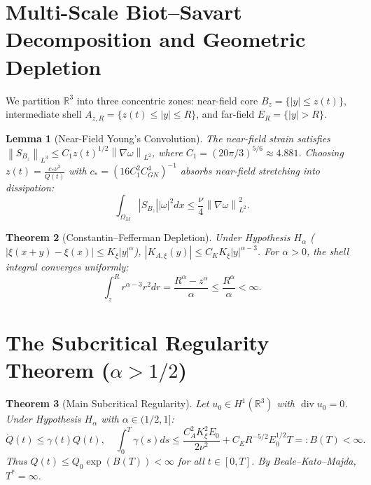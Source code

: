 \documentclass[11pt,reqno]{amsart}
\numberwithin{equation}{section}
\newtheorem{theorem}{Theorem}[section]
\newtheorem{lemma}[theorem]{Lemma}
\theoremstyle{definition}
\newcommand{\R}{\mathbb{R}}
\newcommand{\norm}[1]{\left\lVert#1\right\rVert}
\begin{document}
\section{Multi-Scale Biot--Savart Decomposition and Geometric Depletion}

We partition $\R^3$ into three concentric zones: near-field core $B_z = \{|y| \le z(t)\}$, intermediate shell $A_{z,R} = \{z(t) \le |y| \le R\}$, and far-field $E_R = \{|y| > R\}$.

\begin{lemma}[Near-Field Young's Convolution]\label{lem:near_field}
The near-field strain satisfies $\norm{S_{B_z}}_{L^3} \le C_1 z(t)^{1/2} \norm{\nabla \omega}_{L^2}$, where $C_1 = (20\pi/3)^{5/6} \approx 4.881$. Choosing $z(t) = \frac{c_* \nu^2}{Q(t)}$ with $c_* = (16 C_1^2 C_{GN}^4)^{-1}$ absorbs near-field stretching into dissipation:
\begin{equation}\label{eq:near_absorb}
\int_{\Omega_M} |S_{B_z}| |\omega|^2 dx \le \frac{\nu}{4} \norm{\nabla \omega}_{L^2}^2.
\end{equation}
\end{lemma}

\begin{theorem}[Constantin--Fefferman Depletion]\label{thm:CF}
Under Hypothesis $H_\alpha$ ($|\xi(x+y) - \xi(x)| \le K_\xi |y|^\alpha$), $|K_{A,\xi}(y)| \le C_K K_\xi |y|^{\alpha - 3}$.
For $\alpha > 0$, the shell integral converges uniformly:
\begin{equation}\label{eq:shell_converge}
\int_z^R r^{\alpha - 3} r^2 dr = \frac{R^\alpha - z^\alpha}{\alpha} \le \frac{R^\alpha}{\alpha} < \infty.
\end{equation}
\end{theorem}

\section{The Subcritical Regularity Theorem ($\alpha > 1/2$)}

\begin{theorem}[Main Subcritical Regularity]\label{thm:subcritical}
Let $u_0 \in H^1(\R^3)$ with $\operatorname{div} u_0 = 0$. Under Hypothesis $H_\alpha$ with $\alpha \in (1/2, 1]$:
\begin{equation}\label{eq:gronwall_ode}
\dot{Q}(t) \le \gamma(t) Q(t), \quad \int_0^T \gamma(s) ds \le \frac{C_A^2 K_\xi^2 E_0}{2\nu^2} + C_E R^{-5/2} E_0^{1/2} T =: B(T) < \infty.
\end{equation}
Thus $Q(t) \le Q_0 \exp(B(T)) < \infty$ for all $t \in [0, T]$. By Beale--Kato--Majda, $T^* = \infty$.
\end{theorem}
\end{document}
